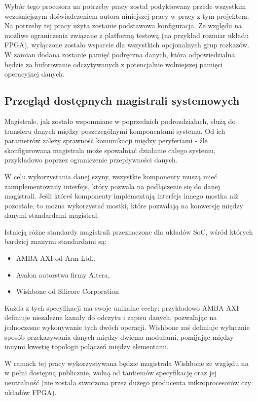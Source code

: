 Wybór tego procesora na potrzeby pracy został podyktowany przede wszystkim wcześniejszym doświadczeniem autora niniejszej pracy w pracy z tym projektem. Na potrzeby tej pracy użyta zostanie podstawowa konfiguracja. Ze względu na możliwe ograniczenia związane z platformą testową (na przykład rozmiar układu FPGA), wyłączone zostało wsparcie dla wszystkich opcjonalnych grup rozkazów. W zamian dodana zostanie pamięć podręczna danych, która odpowiedzialna będzie za buforowanie odczytywanych z potencjalnie wolniejszej pamięci operacyjnej danych.

\subsection{Przegląd dostępnych magistrali systemowych}

Magistrale, jak zostało wspomniane w poprzednich podrozdziałach, służą do transferu danych między poszczególnymi komponentami systemu. Od ich parametrów zależy sprawność komunikacji między peryferiami - źle skonfigurowana magistrala może spowalniać działanie całego systemu, przykładowo poprzez ograniczenie przepływności danych.

W celu wykorzystania danej szyny, wszystkie komponenty muszą mieć zaimplementowany interfejs, który pozwala na podłączenie się do danej magistrali. Jeśli któreś komponenty implementują interfejs innego mostka niż pozostałe, to można wykorzystać mostki, które pozwalają na konwersję między danymi standardami magistral.

Istnieją różne standardy magistrali przeznaczone dla układów SoC, wśród których bardziej znanymi standardami są:
\begin{itemize}
	\item AMBA AXI\cite{amba-axi:2021:Online} od Arm Ltd.,
	\item Avalon\cite{avalon:2005:Online} autorstwa firmy Altera,
	\item Wishbone\cite{wishbone:2019:Online} od Silicore Corporation
\end{itemize}

Każda z tych specyfikacji ma swoje unikalne cechy: przykładowo AMBA AXI definiuje niezależne kanały do odczytu i zapisu danych, pozwalając na jednoczesne wykonywanie tych dwóch operacji. Wishbone zaś definiuje wyłącznie sposób przekazywania danych między dwiema modułami, pomijając między innymi kwestię topologii połączeń między elementami.

W ramach tej pracy wykorzystywana będzie magistrala Wishbone ze względu na w pełni dostępną publicznie, wolną od tantiemów specyfikację oraz jej neutralność (nie została stworzona przez dużego producenta mikroprocesorów czy układów FPGA).

